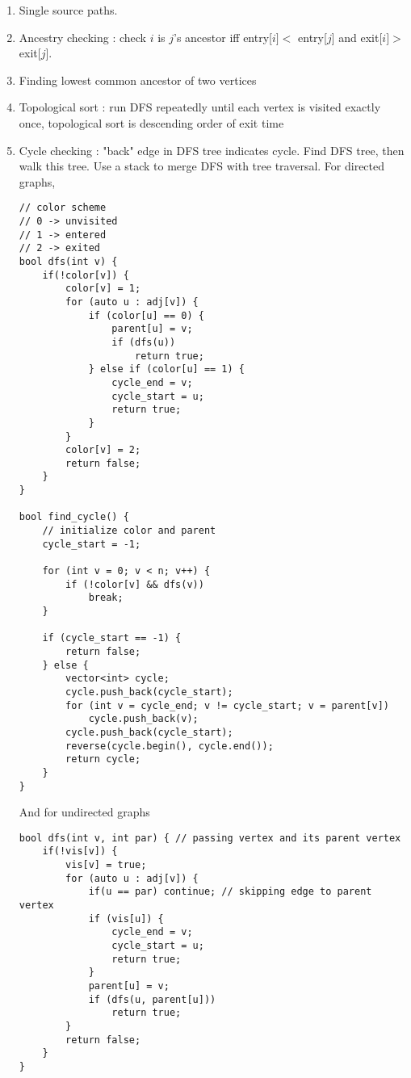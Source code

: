 \documentclass[titlepage, 12pt]{book}
\begin{document}
\begin{enumerate}
    \item Single source paths.
    \item Ancestry checking : check $i$ is $j$'s ancestor iff entry[$i] <$
        entry[$j$] and exit[$i] >$ exit[$j$].
    \item Finding lowest common ancestor of two vertices
    \item Topological sort : run DFS repeatedly until each vertex is visited
        exactly once, topological sort is descending order of exit time
    \item Cycle checking : "back" edge in DFS tree indicates cycle. Find DFS
        tree, then walk this tree. Use a stack to merge DFS with tree traversal.
        For directed graphs,
        \begin{verbatim}
// color scheme                                                 
// 0 -> unvisited
// 1 -> entered
// 2 -> exited
bool dfs(int v) {
    if(!color[v]) {
        color[v] = 1;
        for (auto u : adj[v]) {
            if (color[u] == 0) {
                parent[u] = v;
                if (dfs(u))
                    return true;
            } else if (color[u] == 1) {
                cycle_end = v;
                cycle_start = u;
                return true;
            }
        }
        color[v] = 2;
        return false;
    }    
}        
         
bool find_cycle() {
    // initialize color and parent
    cycle_start = -1;
         
    for (int v = 0; v < n; v++) {
        if (!color[v] && dfs(v))
            break;
    }    
         
    if (cycle_start == -1) {
        return false;
    } else {
        vector<int> cycle;
        cycle.push_back(cycle_start);
        for (int v = cycle_end; v != cycle_start; v = parent[v])
            cycle.push_back(v);
        cycle.push_back(cycle_start);
        reverse(cycle.begin(), cycle.end());
        return cycle;
    }    
}                               
        \end{verbatim}
        And for undirected graphs
\begin{verbatim}
bool dfs(int v, int par) { // passing vertex and its parent vertex  
    if(!vis[v]) {
        vis[v] = true;          
        for (auto u : adj[v]) {     
            if(u == par) continue; // skipping edge to parent vertex
            if (vis[u]) {       
                cycle_end = v;      
                cycle_start = u;    
                return true;        
            }                       
            parent[u] = v;          
            if (dfs(u, parent[u]))  
                return true;        
        }                           
        return false;               
    }                               
}                                   
                

\end{verbatim}
\end{enumerate}
\end{document}
